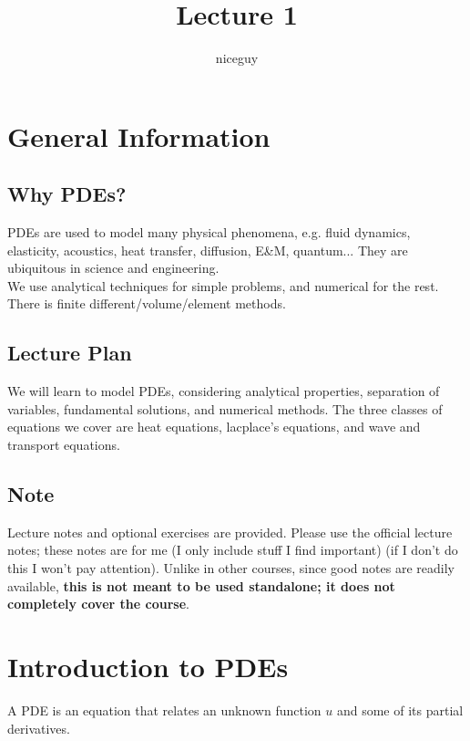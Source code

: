 \documentclass[12pt]{article}
\title{Lecture 1}
\author{niceguy}
\begin{document}
\maketitle

\section{General Information}

\subsection{Why PDEs?}

PDEs are used to model many physical phenomena, e.g. fluid dynamics, elasticity, acoustics, heat transfer, diffusion, E\&M, quantum... They are ubiquitous in science and engineering. \\
We use analytical techniques for simple problems, and numerical for the rest. There is finite different/volume/element methods.

\subsection{Lecture Plan}

We will learn to model PDEs, considering analytical properties, separation of variables, fundamental solutions, and numerical methods. The three classes of equations we cover are heat equations, lacplace's equations, and wave and transport equations.

\subsection{Note}

Lecture notes and optional exercises are provided. Please use the official lecture notes; these notes are for me (I only include stuff I find important) (if I don't do this I won't pay attention). Unlike in other courses, since good notes are readily available, \textbf{this is not meant to be used standalone; it does not completely cover the course}.

\section{Introduction to PDEs}

\begin{defn}[PDE]
    A PDE is an equation that relates an unknown function $u$ and some of its partial derivatives.
\end{defn}
\end{document}
